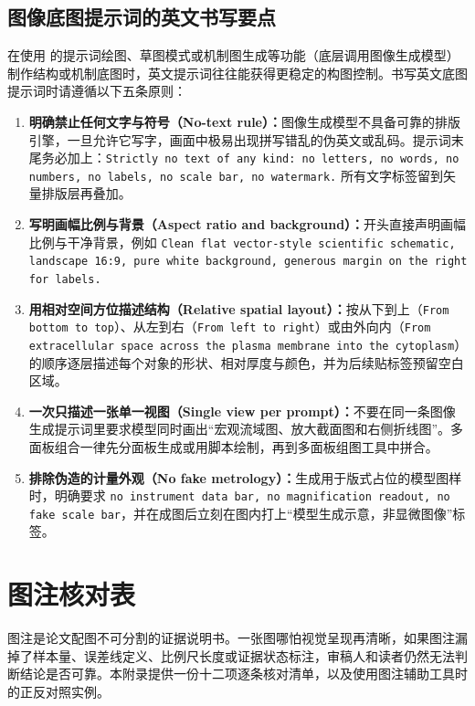 \section{图像底图提示词的英文书写要点}

在使用 \scidraw{} 的提示词绘图、草图模式或机制图生成等功能（底层调用图像生成模型）制作结构或机制底图时，英文提示词往往能获得更稳定的构图控制。书写英文底图提示词时请遵循以下五条原则：

\begin{enumerate}
  \item \textbf{明确禁止任何文字与符号（No-text rule）：}图像生成模型不具备可靠的排版引擎，一旦允许它写字，画面中极易出现拼写错乱的伪英文或乱码。提示词末尾务必加上：\texttt{Strictly no text of any kind: no letters, no words, no numbers, no labels, no scale bar, no watermark.} 所有文字标签留到矢量排版层再叠加。
  \item \textbf{写明画幅比例与背景（Aspect ratio and background）：}开头直接声明画幅比例与干净背景，例如 \texttt{Clean flat vector-style scientific schematic, landscape 16:9, pure white background, generous margin on the right for labels.}
  \item \textbf{用相对空间方位描述结构（Relative spatial layout）：}按从下到上（\texttt{From bottom to top}）、从左到右（\texttt{From left to right}）或由外向内（\texttt{From extracellular space across the plasma membrane into the cytoplasm}）的顺序逐层描述每个对象的形状、相对厚度与颜色，并为后续贴标签预留空白区域。
  \item \textbf{一次只描述一张单一视图（Single view per prompt）：}不要在同一条图像生成提示词里要求模型同时画出“宏观流域图、放大截面图和右侧折线图”。多面板组合一律先分面板生成或用脚本绘制，再到多面板组图工具中拼合。
  \item \textbf{排除伪造的计量外观（No fake metrology）：}生成用于版式占位的模型图样时，明确要求 \texttt{no instrument data bar, no magnification readout, no fake scale bar}，并在成图后立刻在图内打上“模型生成示意，非显微图像”标签。
\end{enumerate}

\chapter{图注核对表}
\label{app:legend-checklist}

图注是论文配图不可分割的证据说明书。一张图哪怕视觉呈现再清晰，如果图注漏掉了样本量、误差线定义、比例尺长度或证据状态标注，审稿人和读者仍然无法判断结论是否可靠。本附录提供一份十二项逐条核对清单，以及使用图注辅助工具时的正反对照实例。

